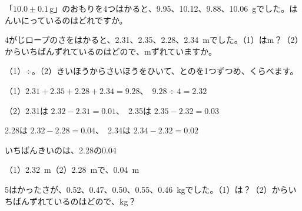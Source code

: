 \begin{jibun}
「$10.0\pm0.1$\,g」のおもりを4つはかると、9.95、10.12、9.88、\qty{10.06}{g}でした。はんいにっているのはどれですか。
\end{jibun}

\begin{reidai}[\R{平均}{へい|きん}と、\R{平均}{へい|きん}からのずれ]
4がじロープのさをはかると、2.31、2.35、2.28、\qty{2.34}{m}でした。（1）はm？（2）からいちばんずれているのはどので、mずれていますか。\par
\kangaekata（1）÷。（2）きいほうからさいほうをひいて、とのを1つずつめ、くらべます。\par
\shiki（1）$2.31+2.35+2.28+2.34=9.28$、\ $9.28\div4=2.32$\par
\hspace*{2.6\zw}（2）2.31は $2.32-2.31=0.01$、\ 2.35は $2.35-2.32=0.03$\par
\hspace*{2.6\zw}\phantom{（2）}2.28は $2.32-2.28=0.04$、\ 2.34は $2.34-2.32=0.02$\par
\hspace*{2.6\zw}\phantom{（2）}いちばんきいのは、2.28の0.04\par
\kotae（1）\qty{2.32}{m}\quad（2）\qty{2.28}{m}で、\qty{0.04}{m}
\end{reidai}

\begin{jibun}
5はかったさが、0.52、0.47、0.50、0.55、\qty{0.46}{kg}でした。（1）は？（2）からいちばんずれているのはどので、kg？
\end{jibun}

